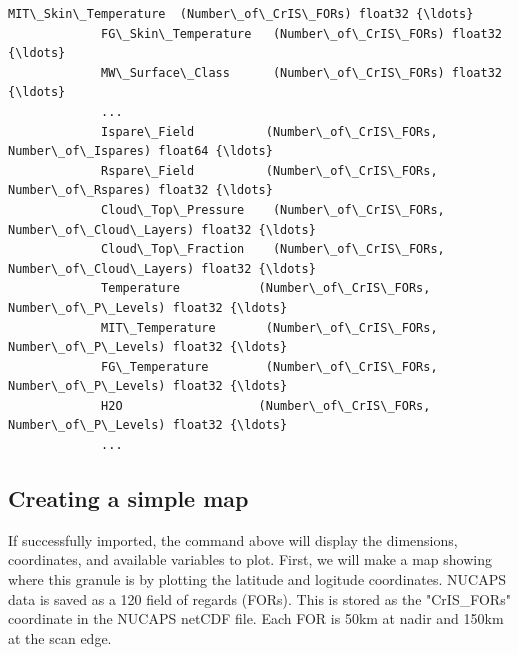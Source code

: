 \documentclass[11pt]{article}
\begin{document}
\begin{Verbatim}[commandchars=\\\{\}]
             MIT\_Skin\_Temperature  (Number\_of\_CrIS\_FORs) float32 {\ldots}
             FG\_Skin\_Temperature   (Number\_of\_CrIS\_FORs) float32 {\ldots}
             MW\_Surface\_Class      (Number\_of\_CrIS\_FORs) float32 {\ldots}
             ...
             Ispare\_Field          (Number\_of\_CrIS\_FORs, Number\_of\_Ispares) float64 {\ldots}
             Rspare\_Field          (Number\_of\_CrIS\_FORs, Number\_of\_Rspares) float32 {\ldots}
             Cloud\_Top\_Pressure    (Number\_of\_CrIS\_FORs, Number\_of\_Cloud\_Layers) float32 {\ldots}
             Cloud\_Top\_Fraction    (Number\_of\_CrIS\_FORs, Number\_of\_Cloud\_Layers) float32 {\ldots}
             Temperature           (Number\_of\_CrIS\_FORs, Number\_of\_P\_Levels) float32 {\ldots}
             MIT\_Temperature       (Number\_of\_CrIS\_FORs, Number\_of\_P\_Levels) float32 {\ldots}
             FG\_Temperature        (Number\_of\_CrIS\_FORs, Number\_of\_P\_Levels) float32 {\ldots}
             H2O                   (Number\_of\_CrIS\_FORs, Number\_of\_P\_Levels) float32 {\ldots}
             ...
\end{Verbatim}

    \subsection{Creating a simple map}\label{creating-a-simple-map}

If successfully imported, the command above will display the dimensions,
coordinates, and available variables to plot. First, we will make a map
showing where this granule is by plotting the latitude and logitude
coordinates. NUCAPS data is saved as a 120 field of regards (FORs). This
is stored as the "CrIS\_FORs" coordinate in the NUCAPS netCDF file. Each
FOR is 50km at nadir and 150km at the scan edge.
\end{document}
